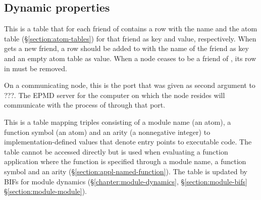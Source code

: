 \subsection{Dynamic properties}

\label{section:node-state-dynamic}

\begin{Lentry}
\item[\T{atom_tables[\Z{N}]}]
This is a table that for each friend of  contains a row with the name
and the atom table (\S\ref{section:atom-tables}) for that friend as key and value,
respectively.
When  gets a new friend, a row should be added to  with
the name of the friend as key and an empty atom table as value.
When a node ceases to be a friend of , its row in
 must be removed.

\item[\T{distribution_port[\Z{N}]}]
On a communicating node, this is the port that was given as second argument
to  ???.
The EPMD server for the computer on which the node resides
will communicate with the 
process of  through that port.

\item[\T{entry_points[\Z{N}]}]
This is a table mapping triples consisting of a module name (an atom), a function
symbol (an atom) and an arity (a nonnegative integer) to
\ifStd implementation-defined values that denote \fi
entry points to executable code.  The table cannot be accessed
directly but is used when evaluating a function application where the function is specified
through a module name, a function symbol and an arity (\S\ref{section:appl-named-function}).
The table is updated by BIFs for module
dynamics (\S\ref{chapter:module-dynamics},
\ifOld\S\ref{section:module-bifs}\fi
\ifStd\S\ref{section:module-module}\fi).


\end{Lentry}
